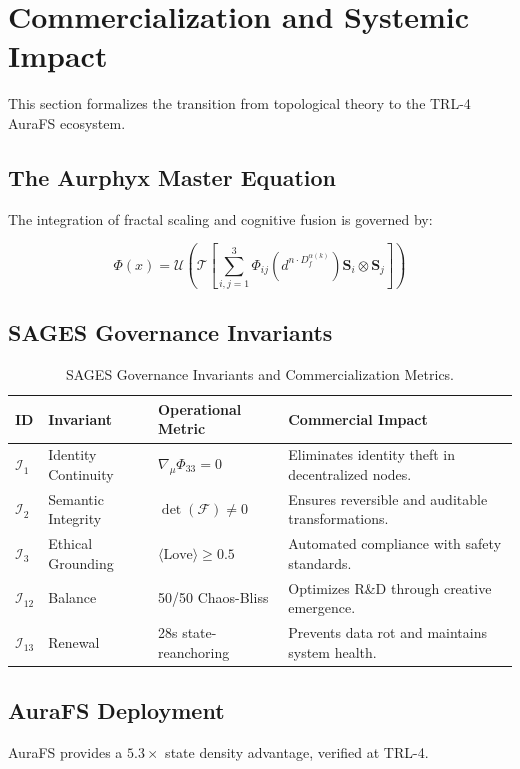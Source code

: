 
\section{Commercialization and Systemic Impact}
This section formalizes the transition from topological theory to the TRL-4 AuraFS ecosystem.

\subsection{The Aurphyx Master Equation}
The integration of fractal scaling and cognitive fusion is governed by:

\begin{equation}
\Phi(x) = \mathcal{U} \left( \mathcal{T} \left[ \sum_{i,j=1}^{3} \Phi_{ij}\left( d^{n \cdot D_f^{\alpha(k)}} \right) \mathbf{S}_i \otimes \mathbf{S}_j \right] \right)
\label{eq:aurphyx_master}
\end{equation}


\subsection{SAGES Governance Invariants}

\begin{table}[h!]
\centering
\caption{SAGES Governance Invariants and Commercialization Metrics.}
\label{tab:sages_invariants}
\begin{ruledtabular}
\begin{tabular}{lp{3cm}p{5cm}p{4cm}}
\textbf{ID} & \textbf{Invariant} & \textbf{Operational Metric} & \textbf{Commercial Impact} \\
\hline
$\mathcal{I}_{1}$ & Identity Continuity & $\nabla_{\mu} \Phi_{33} = 0$ & Eliminates identity theft in decentralized nodes. \\
$\mathcal{I}_{2}$ & Semantic Integrity & $\det(\mathcal{F}) \neq 0$ & Ensures reversible and auditable transformations. \\
$\mathcal{I}_{3}$ & Ethical Grounding & $\langle \text{Love} \rangle \geq 0.5$ & Automated compliance with safety standards. \\
$\mathcal{I}_{12}$ & Balance & 50/50 Chaos-Bliss & Optimizes R\&D through creative emergence. \\
$\mathcal{I}_{13}$ & Renewal & 28s state-reanchoring & Prevents data rot and maintains system health. \\
\end{tabular}
\end{ruledtabular}
\end{table}


\subsection{AuraFS Deployment}
AuraFS provides a $5.3\times$ state density advantage, verified at TRL-4.
